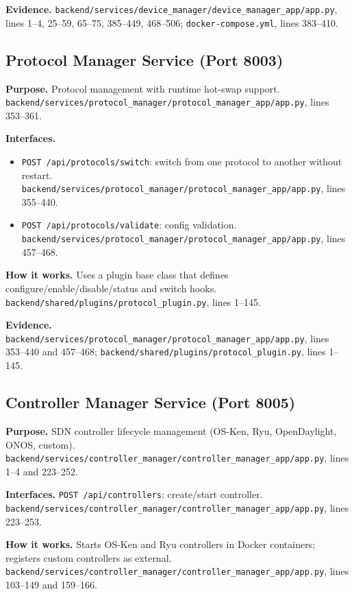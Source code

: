 \documentclass[conference]{IEEEtran}
\begin{document}
\textbf{Evidence.} \texttt{backend/services/device\_manager/device\_manager\_app/app.py}, lines 1--4, 25--59, 65--75, 385--449, 468--506; \texttt{docker-compose.yml}, lines 383--410.

\subsection{Protocol Manager Service (Port 8003)}
\textbf{Purpose.} Protocol management with runtime hot-swap support. \texttt{backend/services/protocol\_manager/protocol\_manager\_app/app.py}, lines 353--361.

\textbf{Interfaces.}
\begin{itemize}
\item \texttt{POST /api/protocols/switch}: switch from one protocol to another without restart. \texttt{backend/services/protocol\_manager/protocol\_manager\_app/app.py}, lines 355--440.
\item \texttt{POST /api/protocols/validate}: config validation. \texttt{backend/services/protocol\_manager/protocol\_manager\_app/app.py}, lines 457--468.
\end{itemize}

\textbf{How it works.} Uses a plugin base class that defines configure/enable/disable/status and switch hooks. \texttt{backend/shared/plugins/protocol\_plugin.py}, lines 1--145.

\textbf{Evidence.} \texttt{backend/services/protocol\_manager/protocol\_manager\_app/app.py}, lines 353--440 and 457--468; \texttt{backend/shared/plugins/protocol\_plugin.py}, lines 1--145.

\subsection{Controller Manager Service (Port 8005)}
\textbf{Purpose.} SDN controller lifecycle management (OS-Ken, Ryu, OpenDaylight, ONOS, custom). \texttt{backend/services/controller\_manager/controller\_manager\_app/app.py}, lines 1--4 and 223--252.

\textbf{Interfaces.} \texttt{POST /api/controllers}: create/start controller. \texttt{backend/services/controller\_manager/controller\_manager\_app/app.py}, lines 223--253.

\textbf{How it works.} Starts OS-Ken and Ryu controllers in Docker containers; registers custom controllers as external. \texttt{backend/services/controller\_manager/controller\_manager\_app/app.py}, lines 103--149 and 159--166.
\end{document}
